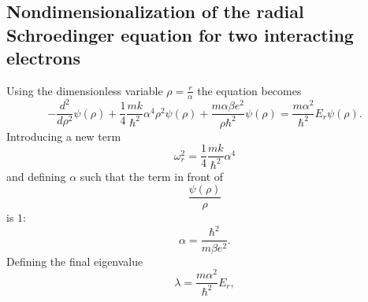 \documentclass[10pt,a4paper]{article}
\begin{document}
\subsection{Nondimensionalization of the radial Schroedinger equation for two interacting electrons}
\label{nondim_2_el}
Using the dimensionless variable $\rho=\frac{r}{\alpha}$ the equation becomes
\begin{equation*}
  -\frac{d^2}{d\rho^2} \psi(\rho) 
       + \frac{1}{4}\frac{mk}{\hbar^2} \alpha^4\rho^2\psi(\rho)+\frac{m\alpha \beta e^2}{\rho\hbar^2}\psi(\rho)  = 
\frac{m\alpha^2}{\hbar^2}E_r \psi(\rho) .
\end{equation*}
Introducing a new term 
$$
\omega_r^2=\frac{1}{4}\frac{mk}{\hbar^2} \alpha^4
$$
and defining $\alpha$ such that the term in front of 
$$
\frac{\psi(\rho)}{\rho}
$$
is $1$:
\begin{equation*}
\alpha = \frac{\hbar^2}{m\beta e^2}.
\end{equation*}
Defining the final eigenvalue
\begin{equation*}
\lambda = \frac{m\alpha^2}{\hbar^2}E_r,
\end{equation*}
\end{document}
